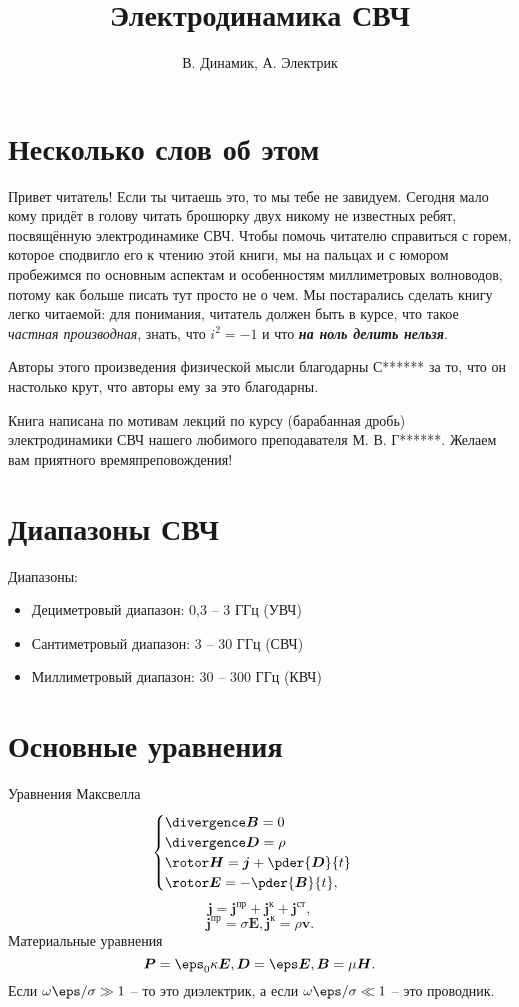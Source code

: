 \documentclass[a4paper, oneside, 12pt]{book}
\renewcommand{\vec}[1]{\boldsymbol{#1}}
\begin{document}
\title{Электродинамика СВЧ}
\author{В. Динамик, А. Электрик}
\maketitle
\tableofcontents
\chapter*{Несколько слов об этом}
    Привет читатель! Если ты читаешь это, то мы тебе не завидуем. Сегодня мало
    кому придёт в голову читать брошюрку двух никому не известных ребят,
    посвящённую электродинамике СВЧ. Чтобы помочь читателю справиться с горем,
    которое сподвигло его к чтению этой книги, мы на пальцах и с юмором
    пробежимся по основным аспектам и особенностям миллиметровых волноводов,
    потому как больше писать тут просто не о чем. Мы постарались сделать книгу
    легко читаемой: для понимания, читатель должен быть в курсе, что такое
    \emph{частная производная}, знать, что \( i^2 = -1 \) и что
    \emph{\bfseries на ноль делить нельзя}.

    Авторы этого произведения физической мысли благодарны С****** за то, что он
    настолько крут, что авторы ему за это благодарны.

    Книга написана по мотивам лекций по курсу (барабанная дробь) электродинамики
    СВЧ нашего любимого преподавателя М. В. Г******. Желаем вам приятного
    времяпреповождения!
\chapter{Диапазоны СВЧ}
  Диапазоны:
  \begin{itemize}
    \item Дециметровый диапазон: 0,3 -- 3 ГГц (УВЧ)
    \item Сантиметровый диапазон: 3 -- 30 ГГц (СВЧ)
    \item Миллиметровый диапазон: 30 -- 300 ГГц (КВЧ)
  \end{itemize}

\chapter{Основные уравнения}
  Уравнения Максвелла
  \[
  \begin{cases}
    \divergence \vec{B} = 0\\
    \divergence\vec{D} = \rho\\
    \rotor\vec{H} = \vec{j} + \pder{\vec{D}}{t}\\
    \rotor\vec{E} = -\pder{\vec{B}}{t},
  \end{cases}
  \]
  \[
    \vec{j} = \vec{j}^\text{пр} + \vec{j}^\text{к} + \vec{j}^\text{ст},
  \]
  \[
    \vec{j}^\text{пр} = \sigma\vec{E}, \vec{j}^\text{к} = \rho\vec{v}.
  \]
  Материальные уравнения
  \[
    \vec{P} = \eps_0\kappa\vec{E}, \vec{D} = \eps\vec{E}, \vec{B} = \mu\vec{H}.
  \]
  Если \(\omega\eps/\sigma \gg 1\) -- то это диэлектрик, а если \(\omega\eps/\sigma \ll 1\) -- это проводник.
\end{document}
